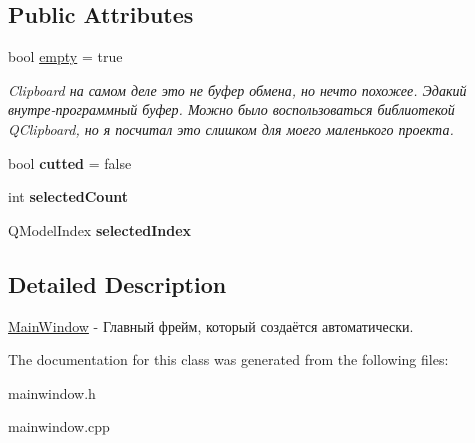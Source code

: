 \subsection*{Public Attributes}
\begin{DoxyCompactItemize}
\item 
\mbox{\label{class_main_window_aea75eabd1a2a44e904eebfee4bede93d}} 
bool \hyperlink{class_main_window_aea75eabd1a2a44e904eebfee4bede93d}{empty} = true
\begin{DoxyCompactList}\small\item\em Clipboard на самом деле это не буфер обмена, но нечто похожее. Эдакий внутре-\/программный буфер. Можно было воспользоваться библиотекой Q\+Clipboard, но я посчитал это слишком для моего маленького проекта. \end{DoxyCompactList}\item 
\mbox{\label{class_main_window_a16f874cb7a61706ee8ca30b21578f9ec}} 
bool {\bfseries cutted} = false
\item 
\mbox{\label{class_main_window_a4e9ddafd764926ca67ea77e564f15677}} 
int {\bfseries selected\+Count}
\item 
\mbox{\label{class_main_window_a67f685d445845eb32195a6392400d082}} 
Q\+Model\+Index {\bfseries selected\+Index}
\end{DoxyCompactItemize}


\subsection{Detailed Description}
\hyperlink{class_main_window}{Main\+Window} -\/ Главный фрейм, который создаётся автоматически. 

The documentation for this class was generated from the following files\+:\begin{DoxyCompactItemize}
\item 
mainwindow.\+h\item 
mainwindow.\+cpp\end{DoxyCompactItemize}

